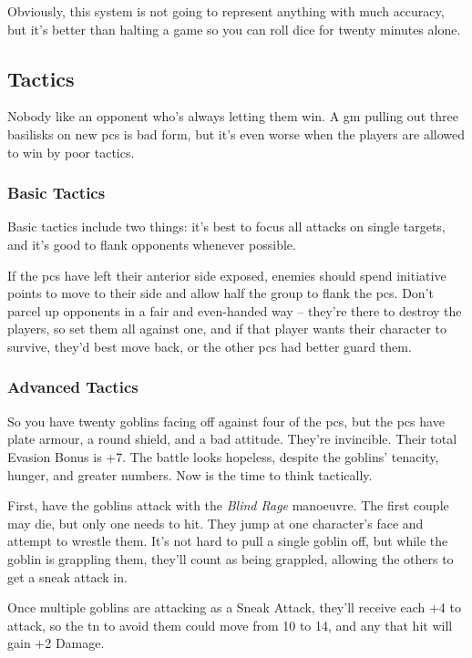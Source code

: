 \begin{multicols}{2}
\begin{exampletext}
\end{exampletext}

Obviously, this system is not going to represent anything with much accuracy, but it's better than halting a game so you can roll dice for twenty minutes alone.

\subsection{Tactics}

Nobody like an opponent who's always letting them win.
A \gls{gm} pulling out three basilisks on new \glspl{pc} is bad form, but it's even worse when the players are allowed to win by poor tactics.

\subsubsection{Basic Tactics}

Basic tactics include two things: it's best to focus all attacks on single targets, and it's good to flank opponents whenever possible.

If the \glspl{pc} have left their anterior side exposed, enemies should spend initiative points to move to their side and allow half the group to flank the \glspl{pc}.
Don't parcel up opponents in a fair and even-handed way -- they're there to destroy the players, so set them all against one, and if that player wants their character to survive, they'd best move back, or the other \glspl{pc} had better guard them.

\subsubsection{Advanced Tactics}

So you have twenty goblins facing off against four of the \glspl{pc}, but the \glspl{pc} have plate armour, a round shield, and a bad attitude.
They're invincible.
Their total Evasion Bonus is +7.
The battle looks hopeless, despite the goblins' tenacity, hunger, and greater numbers.
Now is the time to think tactically.

First, have the goblins attack with the \textit{Blind Rage} manoeuvre.
The first couple may die, but only one needs to hit.
They jump at one character's face and attempt to wrestle them.
It's not hard to pull a single goblin off, but while the goblin is grappling them, they'll count as being grappled, allowing the others to get a sneak attack in.

Once multiple goblins are attacking as a Sneak Attack, they'll receive each +4 to attack, so the \gls{tn} to avoid them could move from 10 to 14, and any that hit will gain +2 Damage.

\vfill\null

\end{multicols}

